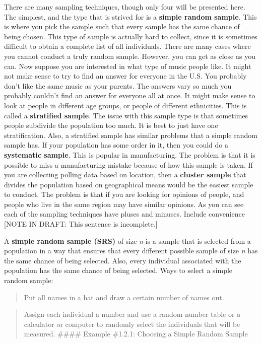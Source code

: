 \documentclass[]{book}
\begin{document}
There are many sampling techniques, though only four will be presented here. The simplest, and the type that is strived for is a \textbf{simple random sample}. This is where you pick the sample such that every sample has the same chance of being chosen. This type of sample is actually hard to collect, since it is sometimes difficult to obtain a complete list of all individuals. There are many cases where you cannot conduct a truly random sample. However, you can get as close as you can. Now suppose you are interested in what type of music people like. It might not make sense to try to find an answer for everyone in the U.S. You probably don't like the same music as your parents. The answers vary so much you probably couldn't find an answer for everyone all at once. It might make sense to look at people in different age groups, or people of different ethnicities. This is called a \textbf{stratified sample}. The issue with this sample type is that sometimes people subdivide the population too much. It is best to just have one stratification. Also, a stratified sample has similar problems that a simple random sample has. If your population has some order in it, then you could do a \textbf{systematic sample}. This is popular in manufacturing. The problem is that it is possible to miss a manufacturing mistake because of how this sample is taken. If you are collecting polling data based on location, then a \textbf{cluster sample} that divides the population based on geographical means would be the easiest sample to conduct. The problem is that if you are looking for opinions of people, and people who live in the same region may have similar opinions. As you can see each of the sampling techniques have pluses and minuses. Include convenience {[}NOTE IN DRAFT: This sentence is incomplete.{]}

A \textbf{simple random sample (SRS)} of size \emph{n} is a sample that is selected from a population in a way that ensures that every different possible sample of size \emph{n} has the same chance of being selected. Also, every individual associated with the population has the same chance of being selected.
Ways to select a simple random sample:

\begin{quote}
Put all names in a hat and draw a certain number of names out.
\end{quote}

\begin{quote}
Assign each individual a number and use a random number table or a calculator or computer to randomly select the individuals that will be measured.
\#\#\#\# Example \#1.2.1: Choosing a Simple Random Sample
\end{quote}
\end{document}
